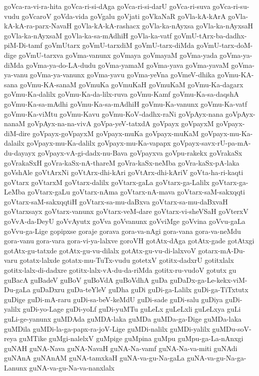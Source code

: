 {goVca-ra-vi-ra-hita
goVca-ri-si-dAga
goVca-ri-si-darU
goVca-ri-suva
goVca-ri-su-vudu
goVcaroV
goVda-vida
goVgalu
goVjati
goVkaNaR
goVla-kA-kArA
goVla-kA-kA-ra-parx-NavaH
goVla-kA-kA-rashacx
goVla-ka-nAyxsa
goVla-ka-nAyxsaH
goVla-ka-nAyxsaM
goVla-ka-sa-mAdhiH
goVla-ka-vatf
goVmU-tArx-ba-dadhx-piM-Di-tamf
goVmUtarx
goVmU-tarxdiM
goVmU-tarx-diMda
goVmU-tarx-doM-dige
goVmU-tarxva
goVma-vanunx
goVmaya
goVmayaM
goVma-yada
goVma-ya-diMda
goVma-ya-do-LA-dudu
goVma-yamaM
goVma-yava
goVma-yavaM
goVma-ya-vanu
goVma-ya-vanunx
goVma-yavu
goVma-yeVna
goVmeV-dhika
goVmu-KA-sana
goVmu-KA-sanaM
goVmuKa
goVmuKaH
goVmuKaM
goVmu-Ka-dagarx
goVmu-Ka-dalilx
goVmu-Ka-da-lilx-ruva
goVmu-Kamf
goVmu-Ka-sa-daqshA
goVmu-Ka-sa-mAdhi
goVmu-Ka-sa-mAdhiH
goVmu-Ka-vanunx
goVmu-Ka-vatf
goVmu-Ka-viMtu
goVmu-Kavu
goVmu-KoV-dadhx-raNi
goVpAyx-nana
goVpAyx-nanaM
goVpAyx-na-na-vivA
goVpa-yeV-tatxdA
goVpayx
goVpayxM
goVpayx-diM-dire
goVpayx-goVpayxM
goVpayx-muKa
goVpayx-muKaM
goVpayx-mu-Ka-dalailx
goVpayx-mu-Ka-dalilx
goVpayx-mu-Ka-vapapx
goVpayx-savx-rU-pa-mA-du-dayayx
goVpayx-vA-gi-dadx-nu-Bava
goVpayxva
goVpu-rakekx
goVrakaSx
goVrakaSxH
goVra-kaSx-nA-thareM
goVra-kaSx-neMba
goVra-kaSx-pA-laka
goVshAle
goVtArxNi
goVtArx-dhi-kAri
goVtArx-dhi-kAriV
goVta-ha-ri-kaqti
goVtarx
goVtarxM
goVtarx-dalilx
goVtarx-gaLa
goVtarx-ga-Lalilx
goVtarx-ga-LeMba
goVtarx-gaLu
goVtarx-nAma
goVtarx-nA-mava
goVtarx-saM-sakxqqti
goVtarx-saM-sakxqqtiH
goVtarx-sa-mu-daBxva
goVtarx-sa-mu-daBxvaH
goVtarxsayx
goVtarx-vanunx
goVtarx-veM-dare
goVtarx-vi-sheVSaH
goVterxV
goVvA-da-DeyU
goVvAyutx
goVva
goVvanunx
goVviMge
goVvina
goVvu-gaLa
goVvu-ga-Lige
gopipxse
goraje
gorava
gora-va-nAgi
gora-vana
gora-va-neMdu
gora-vanu
gora-vara
gora-vi-ya-lalxve
goroVH
gotAtx-dAga
gotAtx-gade
gotAtxgi
gotAtx-gu-tatxde
gotAtx-gu-vu-dilalx
gotAtx-gu-vu-di-lalxvoV
gotarx-mA-Du-varu
gotatx-lalxde
gotatx-mu-TuTx-vudu
gotetxV
gotitx-dadxrU
gotitxlalx
gotitx-lalx-di-dadxre
gotitx-lalx-vA-du-da-riMda
gotitx-ru-vudoV
gotutx
gu
guBacA
guBadeV
guBoV
guBoVdA
guBoVdhA
guDa
guDaDx-ga-Le-kekx-viM-Du-gaLa
guDaDxru
guDa-teYleV
guDha
guDi
guDi-ga-Lalilx
guDi-ga-TiTxtutx
guDige
guDi-mA-raru
guDi-sa-beV-keMdU
guDi-sade
guDi-salu
guDiya
guDi-yalilx
guDi-yo-Lage
guDi-yoLf
guDi-yuMTu
guLeLx
guLeLxli
guLeLxya
guLi
guLi-ge-yanunx
guMDAda
guMDA-laka
guMDa
guMDa-ga-Dige
guMDa-laka
guMDila
guMDi-la-ga-papx-ra-joV-Lige
guMDi-nalilx
guMDi-yalilx
guMDu-soV-reya
guMTike
guMgi-nalelxV
guMpige
guMpina
guMpu
guMpu-ga-La-nAnxgi
guNAH
guNA-Nava
guNA-NavaH
guNA-Na-vamf
guNA-Na-va-miti
guNAdi
guNAnA
guNAnAM
guNA-tamxkaH
guNA-va-gu-Na-gaLa
guNA-va-gu-Na-ga-Lanunx
guNA-va-gu-Na-va-nanxlalx
}
